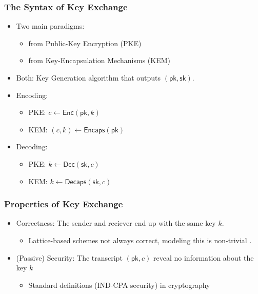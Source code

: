 \documentclass{beamer}
\newcommand{\pk}{\mathsf{pk}}
\newcommand{\sk}{\mathsf{sk}}
\newcommand{\enc}{\mathsf{Enc}}
\newcommand{\dec}{\mathsf{Dec}}
\newcommand{\encaps}{\mathsf{Encaps}}
\newcommand{\decaps}{\mathsf{Decaps}}
\theoremstyle{definition}
\begin{document}
\begin{frame}
	\frametitle{The Syntax of Key Exchange}
	\begin{itemize}
		\item Two main paradigms:\pause
		\begin{itemize}
			\item from \alert{Public-Key Encryption} (PKE)\pause
			\item from \alert{Key-Encapsulation Mechanisms} (KEM)\pause			
		\end{itemize}
	\item \alert{Both}: Key Generation algorithm that outputs $(\pk ,\sk)$.\pause
	\item Encoding:\pause
	\begin{itemize}
		\item \alert{PKE}: $c\gets \enc(\pk, k)$\pause
		\item \alert{KEM}: $(c, k)\gets \encaps(\pk)$\pause
	\end{itemize}
\item Decoding:\pause
\begin{itemize}
	\item \alert{PKE}: $k \gets \dec(\sk, c)$\pause
	\item \alert{KEM}: $k\gets \decaps(\sk, c)$
\end{itemize}
	\end{itemize}
\end{frame}

\begin{frame}
	\frametitle{Properties of Key Exchange}
	\begin{itemize}
			\item \alert{Correctness}: The sender and reciever end up with the same key $k$.\pause 
			\begin{itemize}
				\item Lattice-based schemes not always correct, modeling this is non-trivial \cite{TCC:HofHovKil17}.\pause
			\end{itemize}
			\item (Passive) \alert{Security}: The transcript $(\pk, c)$ reveal no information about the key $k$\pause
			\begin{itemize}
				\item Standard definitions (IND-CPA security) in cryptography
			\end{itemize}
	\end{itemize}
\end{frame}
\end{document}
